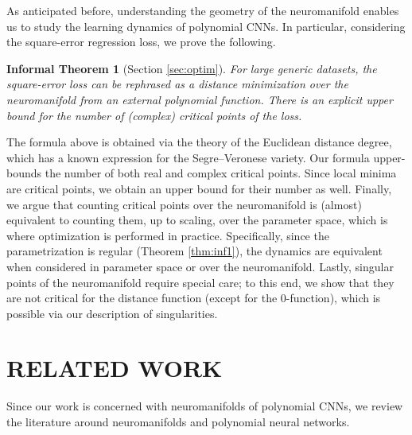 \documentclass[twoside]{article}
\theoremstyle{plain}%
\newtheorem{infthm}[thm]{Informal Theorem}
\theoremstyle{definition}
\theoremstyle{remark}
\begin{document}
As anticipated before, understanding the geometry of the neuromanifold enables us to study the learning dynamics of polynomial CNNs. In particular,  considering the square-error regression loss, we prove the following. 
\begin{infthm}[Section \ref{sec:optim}]
For large generic datasets, the square-error loss can be rephrased as a distance minimization over the neuromanifold from an external polynomial function. There is an explicit upper bound for the number of (complex) critical points of the loss. 
\end{infthm}
The formula above is obtained via the theory of the Euclidean distance degree, which has a known expression for the Segre--Veronese variety.
Our formula upper-bounds the number of both real and complex critical points. Since local minima are critical points, we obtain an upper bound for their number as well. Finally, we argue that  counting critical points over the neuromanifold is (almost) equivalent to counting them, up to scaling, over the parameter space, which is where optimization is performed in practice. Specifically, since the parametrization is regular (Theorem \ref{thm:inf1}), the dynamics are equivalent when considered in parameter space or over the neuromanifold. Lastly, singular points of the neuromanifold require special care; to this end, we show that they are not critical for the distance function (except for the 0-function), which is possible via our description of singularities. 

\section{RELATED WORK}
Since our work is concerned with neuromanifolds of polynomial CNNs, we review the literature around neuromanifolds and polynomial neural networks. 
\end{document}
